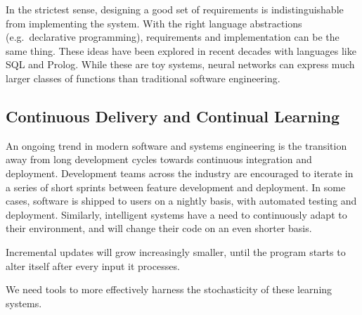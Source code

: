 \documentclass[12pt,initial,twoside,maitrise]{dms}
\numberwithin{equation}{section}
\numberwithin{table}{chapter}
\numberwithin{figure}{chapter}
\begin{document}
In the strictest sense, designing a good set of requirements is indistinguishable from implementing the system. With the right language abstractions (e.g.\ declarative programming), requirements and implementation can be the same thing. These ideas have been explored in recent decades with languages like SQL and Prolog. While these are toy systems, neural networks can express much larger classes of functions than traditional software engineering.

\subsection{Continuous Delivery and Continual Learning}

An ongoing trend in modern software and systems engineering is the transition away from long development cycles towards continuous integration and deployment. Development teams across the industry are encouraged to iterate in a series of short sprints between feature development and deployment. In some cases, software is shipped to users on a nightly basis, with automated testing and deployment. Similarly, intelligent systems have a need to continuously adapt to their environment, and will change their code on an even shorter basis.

Incremental updates will grow increasingly smaller, until the program starts to alter itself after every input it processes.

We need tools to more effectively harness the stochasticity of these learning systems.

%
%



\end{document}
